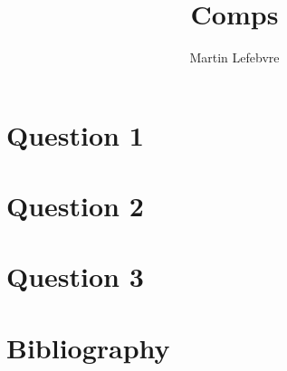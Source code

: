 \documentclass[12pt,letterpaper,notitlepage,onecolumn,final,openbib]{book}
\author{Martin Lefebvre}
\title{Comps}
\begin{document}
	
\chapter{Question 1}

\chapter{Question 2}

\chapter{Question 3}
	
\chapter{Bibliography}	
	\pagebreak
	
	
\end{document}
